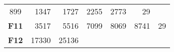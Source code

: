 \documentclass[12pt,a4paper]{article}
\begin{document}
\begin{longtable}[c]{@{}crrrrrr@{}}
\begin{minipage}[t]{0.08\columnwidth}
899
\strut\end{minipage} &
\begin{minipage}[t]{0.08\columnwidth}\raggedleft\strut
1347
\strut\end{minipage} &
\begin{minipage}[t]{0.09\columnwidth}\raggedleft\strut
1727
\strut\end{minipage} &
\begin{minipage}[t]{0.10\columnwidth}\raggedleft\strut
2255
\strut\end{minipage} &
\begin{minipage}[t]{0.11\columnwidth}\raggedleft\strut
2773
\strut\end{minipage} &
\begin{minipage}[t]{0.07\columnwidth}\raggedleft\strut
29
\strut\end{minipage}\tabularnewline
\begin{minipage}[t]{0.11\columnwidth}\centering\strut
\textbf{F11}
\strut\end{minipage} &
\begin{minipage}[t]{0.08\columnwidth}\raggedleft\strut
3517
\strut\end{minipage} &
\begin{minipage}[t]{0.08\columnwidth}\raggedleft\strut
5516
\strut\end{minipage} &
\begin{minipage}[t]{0.09\columnwidth}\raggedleft\strut
7099
\strut\end{minipage} &
\begin{minipage}[t]{0.10\columnwidth}\raggedleft\strut
8069
\strut\end{minipage} &
\begin{minipage}[t]{0.11\columnwidth}\raggedleft\strut
8741
\strut\end{minipage} &
\begin{minipage}[t]{0.07\columnwidth}\raggedleft\strut
29
\strut\end{minipage}\tabularnewline
\begin{minipage}[t]{0.11\columnwidth}\centering\strut
\textbf{F12}
\strut\end{minipage} &
\begin{minipage}[t]{0.08\columnwidth}\raggedleft\strut
17330
\strut\end{minipage} &
\begin{minipage}[t]{0.08\columnwidth}\raggedleft\strut
25136
\strut\end{minipage} &
\begin{minipage}[t]{0.09\columnwidth}\raggedleft\strut

\end{minipage}
\end{longtable}
\end{document}
